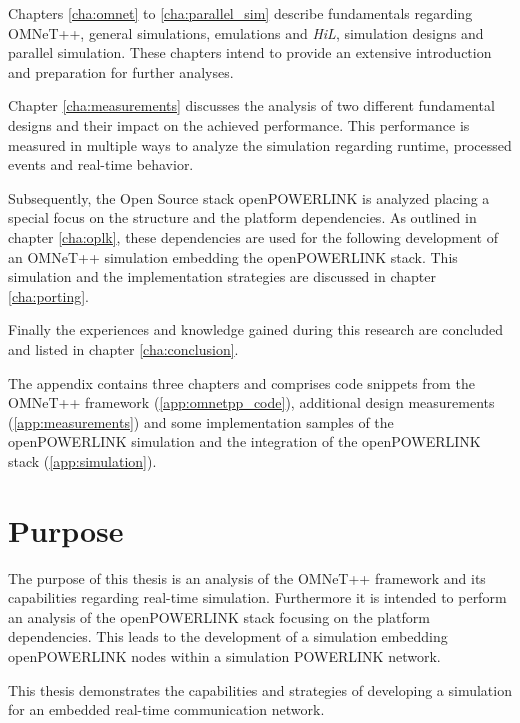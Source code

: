 Chapters \ref{cha:omnet} to \ref{cha:parallel_sim} describe fundamentals regarding OMNeT++, general simulations, emulations and \emph{HiL}, simulation designs and parallel simulation.
These chapters intend to provide an extensive introduction and preparation for further analyses.

Chapter \ref{cha:measurements} discusses the analysis of two different fundamental designs and their impact on the achieved performance.
This performance is measured in multiple ways to analyze the simulation regarding runtime, processed events and real-time behavior.

Subsequently, the Open Source stack openPOWERLINK is analyzed placing a special focus on the structure and the platform dependencies.
As outlined in chapter \ref{cha:oplk}, these dependencies are used for the following development of an OMNeT++ simulation embedding the openPOWERLINK stack.
This simulation and the implementation strategies are discussed in chapter \ref{cha:porting}.

Finally the experiences and knowledge gained during this research are concluded and listed in chapter \ref{cha:conclusion}.

The appendix contains three chapters and comprises code snippets from the OMNeT++ framework (\ref{app:omnetpp_code}), additional design measurements (\ref{app:measurements}) and some implementation samples of the openPOWERLINK simulation and the integration of the openPOWERLINK stack (\ref{app:simulation}).

\section{Purpose}
The purpose of this thesis is an analysis of the OMNeT++ framework and its capabilities regarding real-time simulation.
Furthermore it is intended to perform an analysis of the openPOWERLINK stack focusing on the platform dependencies.
This leads to the development of a simulation embedding openPOWERLINK nodes within a simulation POWERLINK network.

This thesis demonstrates the capabilities and strategies of developing a simulation for an embedded real-time communication network.